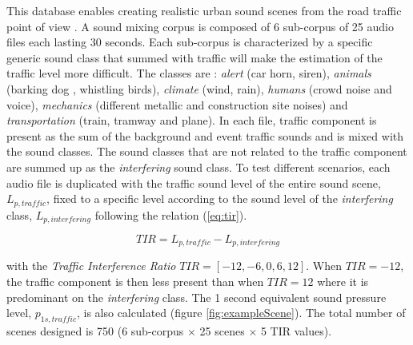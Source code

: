 \documentclass[twocolumn,a4paper,10pt]{article}
\begin{document}
This database enables creating realistic urban sound scenes from the road traffic point of view \cite{gloaguen_creation_2017}. A sound mixing corpus is composed of 6 sub-corpus of 25 audio files each lasting 30 seconds. Each sub-corpus is characterized by a specific generic sound class that summed with traffic will make the estimation of the traffic level more difficult. The classes are : \textit{alert} (car horn, siren), \textit{animals} (barking dog , whistling birds), \textit{climate} (wind, rain), \textit{humans} (crowd noise and voice), \textit{mechanics} (different metallic and construction site noises) and \textit{transportation} (train, tramway and plane). In each file, traffic component is present as the sum of the background and event traffic sounds and is mixed with the sound classes. The sound classes that are not related to the traffic component are summed up as the \textit{interfering} sound class. To test different scenarios, each audio file is duplicated with the traffic sound level of the entire sound scene, $L_{p,traffic}$, fixed to a specific level according to the sound level of the \textit{interfering} class, $L_{p,interfering}$ following the relation (\ref{eq:tir}).

\begin{equation}\label{eq:tir}
TIR = L_{p,traffic}-L_{p,interfering}
\end{equation}

with the \textit{Traffic Interference Ratio} $TIR = \left[-12, -6, 0, 6, 12\right]$. When $TIR = -12$, the traffic component is then less present than when $TIR = 12$ where it is predominant on the \textit{interfering} class. The 1 second equivalent sound pressure level, $p_{1s,traffic}$, is also calculated (figure \ref{fig:exampleScene}). The total number of scenes designed is 750 (6 sub-corpus $\times$ 25 scenes $\times$  5 TIR values).
\end{document}
